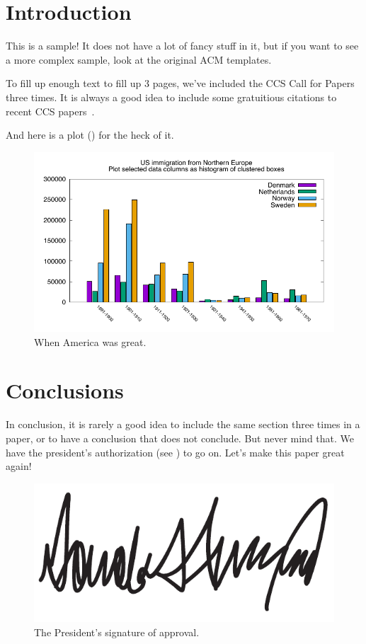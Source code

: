 \section{Introduction}

This is a sample!  It does not have a lot of fancy stuff in it, but if
you want to see a more complex sample, look at the original ACM
templates.

To fill up enough text to fill up 3 pages, we've included the CCS Call
for Papers three times.  It is always a good idea to include some
gratuitious citations to recent CCS papers~\cite{medvinsky1993netcash,
  bellare1993random, anderson1993cryptosystems, blaze1993cryptographic}.

And here is a plot () for the heck of it.

\begin{figure}[h]
\centering
\includegraphics[width=\columnwidth]{plots/plot-sample}
\caption{When America was great.}
\label{fig:plot-sample}
\end{figure}





\section{Conclusions}

In conclusion, it is rarely a good idea to include the same section three times in a paper, or to have a conclusion that does not conclude.
%
But never mind that. We have the president's authorization (see ) to go on. Let's make this paper great again!

\begin{figure}[h]
\centering
\includegraphics[width=.75\columnwidth]{figs/fig-sample}
\caption{The President's signature of approval.}
\label{fig:president-sig}
\end{figure}

